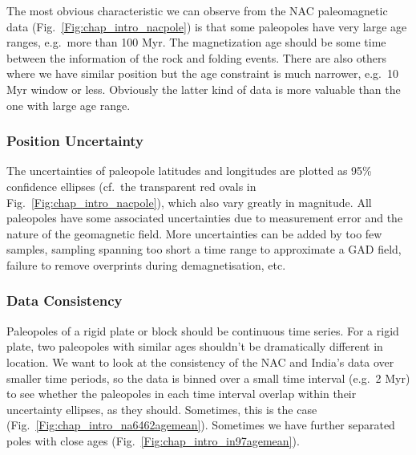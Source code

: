 The most obvious characteristic we can observe from the NAC paleomagnetic data
(Fig.~\ref{Fig:chap_intro_nacpole}) is that some paleopoles have very large age
ranges, e.g.\ more than 100 Myr. The magnetization age should be some time
between the information of the rock and folding events. There are also others
where we have similar position but the age constraint is much narrower, e.g.\ 10
Myr window or less. Obviously the latter kind of data is more valuable than the
one with large age range.

\subsubsection{Position Uncertainty}\label{sec:posu}

The uncertainties of paleopole latitudes and longitudes are plotted as 95\%
confidence ellipses (cf.\ the transparent red ovals in
Fig.~\ref{Fig:chap_intro_nacpole}), which also vary greatly in magnitude. All
paleopoles have some associated uncertainties due to measurement error and the
nature of the geomagnetic field. More uncertainties can be added by too few
samples, sampling spanning too short a time range to approximate a GAD field,
failure to remove overprints during demagnetisation, etc.

\subsubsection{Data Consistency}\label{sec:datcons}

Paleopoles of a rigid plate or block should be continuous time series. For a
rigid plate, two paleopoles with similar ages shouldn't be dramatically
different in location. We want to look at the consistency of the NAC and India's
data over smaller time periods, so the data is binned over a small time interval
(e.g.\ 2 Myr) to see whether the paleopoles in each time interval overlap within
their uncertainty ellipses, as they should. Sometimes, this is the case
(Fig.~\ref{Fig:chap_intro_na6462agemean}). Sometimes we have further separated
poles with close ages (Fig.~\ref{Fig:chap_intro_in97agemean}).


